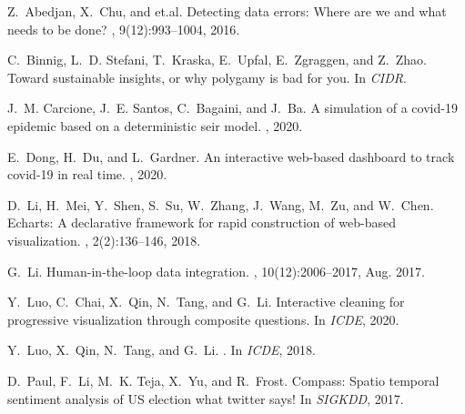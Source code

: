 \maketitle










% 
%   

\begin{thebibliography}{10}

Z.~Abedjan, X.~Chu, and et.al.
\newblock Detecting data errors: Where are we and what needs to be done?
, 9(12):993--1004, 2016.

C.~Binnig, L.~D. Stefani, T.~Kraska, E.~Upfal, E.~Zgraggen, and Z.~Zhao.
\newblock Toward sustainable insights, or why polygamy is bad for you.
\newblock In {\em {CIDR}}.

J.~M. Carcione, J.~E. Santos, C.~Bagaini, and J.~Ba.
\newblock A simulation of a covid-19 epidemic based on a deterministic seir
  model.
, 2020.

E.~Dong, H.~Du, and L.~Gardner.
\newblock An interactive web-based dashboard to track covid-19 in real time.
, 2020.

D.~Li, H.~Mei, Y.~Shen, S.~Su, W.~Zhang, J.~Wang, M.~Zu, and W.~Chen.
\newblock Echarts: {A} declarative framework for rapid construction of
  web-based visualization.
, 2(2):136--146, 2018.

G.~Li.
\newblock Human-in-the-loop data integration.
, 10(12):2006–2017, Aug. 2017.

Y.~Luo, C.~Chai, X.~Qin, N.~Tang, and G.~Li.
\newblock Interactive cleaning for progressive visualization through composite
  questions.
\newblock In {\em ICDE}, 2020.

Y.~Luo, X.~Qin, N.~Tang, and G.~Li.
.
\newblock In {\em ICDE}, 2018.

D.~Paul, F.~Li, M.~K. Teja, X.~Yu, and R.~Frost.
\newblock Compass: Spatio temporal sentiment analysis of {US} election what
  twitter says!
\newblock In {\em SIGKDD}, 2017.


\end{thebibliography}
